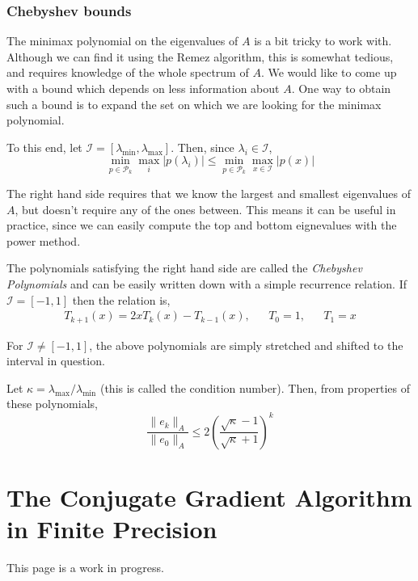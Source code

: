\hypertarget{chebyshev-bounds}{%
\subsubsection{Chebyshev bounds}\label{chebyshev-bounds}}

The minimax polynomial on the eigenvalues of \(A\) is a bit tricky to
work with. Although we can find it using the Remez algorithm, this is
somewhat tedious, and requires knowledge of the whole spectrum of \(A\).
We would like to come up with a bound which depends on less information
about \(A\). One way to obtain such a bound is to expand the set on
which we are looking for the minimax polynomial.

To this end, let
\(\mathcal{I} = [\lambda_{\text{min}},\lambda_{\text{max}}]\). Then,
since \(\lambda_i\in\mathcal{I}\), \[
\min_{p\in\mathcal{P}_k} \max_i |p(\lambda_i)| 
\leq \min_{p\in\mathcal{P}_k} \max_{x \in \mathcal{I}} |p(x)| 
\]

The right hand side requires that we know the largest and smallest
eigenvalues of \(A\), but doesn't require any of the ones between. This
means it can be useful in practice, since we can easily compute the top
and bottom eignevalues with the power method.

The polynomials satisfying the right hand side are called the
\emph{Chebyshev Polynomials} and can be easily written down with a
simple recurrence relation. If \(\mathcal{I} = [-1,1]\) then the
relation is, \begin{align*}
T_{k+1}(x) = 2xT_k(x) - T_{k-1}(x)
,&&
T_0=1
,&&
T_1=x    
\end{align*}

For \(\mathcal{I} \neq [-1,1]\), the above polynomials are simply
stretched and shifted to the interval in question.

Let \(\kappa = \lambda_{\text{max}} / \lambda_{\text{min}}\) (this is
called the condition number). Then, from properties of these
polynomials, \[
\frac{\|e_k\|_A}{\|e_0\|_A} \leq 2 \left( \frac{\sqrt{\kappa}-1}{\sqrt{\kappa}+1} \right)^k
\]

\hypertarget{the-conjugate-gradient-algorithm-in-finite-precision}{%
\section{The Conjugate Gradient Algorithm in Finite
Precision}\label{the-conjugate-gradient-algorithm-in-finite-precision}}

This page is a work in progress.

